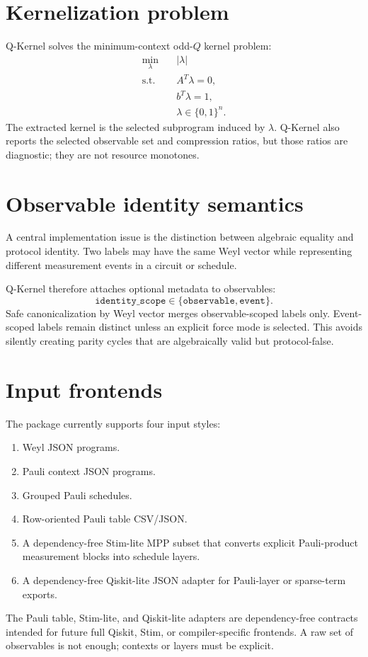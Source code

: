 \documentclass[11pt]{article}
\begin{document}
\section{Kernelization problem}

Q-Kernel solves the minimum-context odd-\(Q\) kernel problem:
\[
\begin{aligned}
  \min_\lambda\quad & |\lambda| \\
  \text{s.t.}\quad & A^T\lambda=0,\\
                  & b^T\lambda=1,\\
                  & \lambda\in\{0,1\}^n.
\end{aligned}
\]
The extracted kernel is the selected subprogram induced by \(\lambda\).  Q-Kernel also reports the selected observable set and compression ratios, but those ratios are diagnostic; they are not resource monotones.

\section{Observable identity semantics}

A central implementation issue is the distinction between algebraic equality and protocol identity.  Two labels may have the same Weyl vector while representing different measurement events in a circuit or schedule.

Q-Kernel therefore attaches optional metadata to observables:
\[
  \texttt{identity\_scope}\in\{\texttt{observable},\texttt{event}\}.
\]
Safe canonicalization by Weyl vector merges observable-scoped labels only.  Event-scoped labels remain distinct unless an explicit force mode is selected.  This avoids silently creating parity cycles that are algebraically valid but protocol-false.

\section{Input frontends}

The package currently supports four input styles:
\begin{enumerate}[leftmargin=*]
  \item Weyl JSON programs.
  \item Pauli context JSON programs.
  \item Grouped Pauli schedules.
  \item Row-oriented Pauli table CSV/JSON.
  \item A dependency-free Stim-lite MPP subset that converts explicit Pauli-product measurement blocks into schedule layers.\n  \item A dependency-free Qiskit-lite JSON adapter for Pauli-layer or sparse-term exports.
\end{enumerate}
The Pauli table, Stim-lite, and Qiskit-lite adapters are dependency-free contracts intended for future full Qiskit, Stim, or compiler-specific frontends.  A raw set of observables is not enough; contexts or layers must be explicit.
\end{document}
